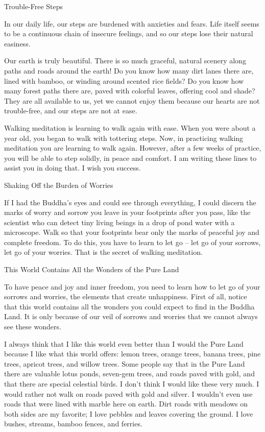  

Trouble-Free Steps

In our daily life, our steps are burdened with anxieties and fears.  Life itself seems to be a continuous chain of insecure feelings, and so our steps lose their natural easiness. 

Our earth is truly beautiful.  There is so much graceful, natural scenery along paths and roads around the earth!  Do you know how many dirt lanes there are, lined with bamboo, or winding around scented rice fields?  Do you know how many forest paths there are, paved with colorful leaves, offering cool and shade?  They are all available to us, yet we cannot enjoy them because our hearts are not trouble-free, and our steps are not at ease.

Walking meditation is learning to walk again with ease.  When you were about a year old, you began to walk with tottering steps.  Now, in practicing walking meditation you are learning to walk again.  However, after a few weeks of practice, you will be able to step solidly, in peace and comfort.  I am writing these lines to assist you in doing that.  I wish you success.

 

Shaking Off the Burden of Worries

If I had the Buddha’s eyes and could see through everything, I could discern the marks of worry and sorrow you leave in your footprints after you pass, like the scientist who can detect tiny living beings in a drop of pond water with a microscope.  Walk so that your footprints bear only the marks of peaceful joy and complete freedom.  To do this, you have to learn to let go – let go of your sorrows, let go of your worries.  That is the secret of walking meditation.

 

This World Contains All the Wonders of the Pure Land

To have peace and joy and inner freedom, you need to learn how to let go of your sorrows and worries, the elements that create unhappiness.  First of all, notice that this world contains all the wonders you could expect to find in the Buddha Land.  It is only because of our veil of sorrows and worries that we cannot always see these wonders.

I always think that I like this world even better than I would the Pure Land because I like what this world offers: lemon trees, orange trees, banana trees, pine trees, apricot trees, and willow trees.  Some people say that in the Pure Land there are valuable lotus ponds, seven-gem trees, and roads paved with gold, and that there are special celestial birds.  I don’t think I would like these very much.  I would rather not walk on roads paved with gold and silver.  I wouldn’t even use roads that were lined with marble here on earth.  Dirt roads with meadows on both sides are my favorite; I love pebbles and leaves covering the ground.  I love bushes, streams, bamboo fences, and ferries. 

